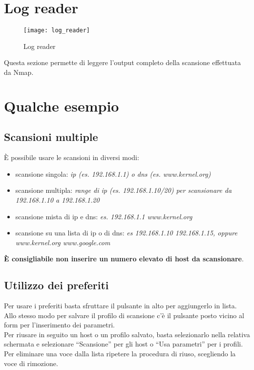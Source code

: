 \chapter{Log reader}
\label{ch:LogReader}

\begin{figure}[h]
  \centering
  \texttt{[image: log\_reader]}
  \caption{Log reader}
  \label{fig:LodReader}
\end{figure}
Questa sezione permette di leggere l'output completo della scansione 
effettuata da Nmap.

\chapter{Qualche esempio}
\label{ch:Examples}

\section{Scansioni multiple}
\label{sec:ExamplesMultipleScan}

\`E possibile usare le scansioni in diversi modi:
\begin{itemize}
\item scansione singola: \emph{ip (es. 192.168.1.1) o dns (es. www.kernel.org)}
\item scansione multipla: \emph{range di ip (es. 192.168.1.10/20) per scansionare 
  da 192.168.1.10 a 192.168.1.20}
\item scansione mista di ip e dns: \emph{es. 192.168.1.1 www.kernel.org}
\item scansione su una lista di ip o di dns: \emph{es 192.168.1.10 192.168.1.15, 
  oppure www.kernel.org www.google.com}
\end{itemize}
\textbf{\`E consigliabile non inserire un numero elevato di host da scansionare}.

\section{Utilizzo dei preferiti}
\label{sec:ExamplesUseBookmarks}

Per usare i preferiti basta sfruttare il pulsante in alto per aggiungerlo in lista.\\
Allo stesso modo per salvare il profilo di scansione c'\`e il pulsante posto vicino 
al form per l'inserimento dei parametri.\\
Per riusare in seguito un host o un profilo salvato, basta selezionarlo nella relativa 
schermata e selezionare ``Scansione'' per gli host o ``Usa parametri'' per i profili.\\ 
Per eliminare una voce dalla lista ripetere la procedura di riuso, scegliendo la voce di 
rimozione.
